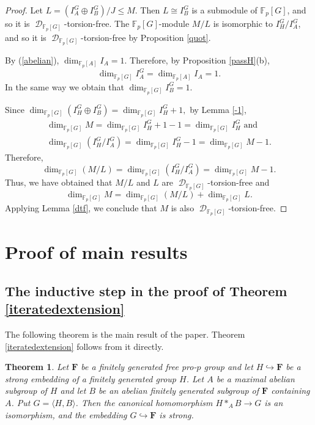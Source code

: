 \documentclass[11pt]{amsart}
\newtheorem{teo}[lem]{Theorem}
\numberwithin{claimcounter}{lem}
\DeclareMathOperator{\D}{\mathcal D}
\newcommand{\F}{\mathbb{F}}
\begin{document}
\begin{proof} Let $L=(I^G_A\oplus I^G_B)/J\le M$. Then $L\cong I^G_B $ is a submodule of $\F_p[G]$, and so it is $\D_{\F_p[G]}$-torsion-free. The $\F_p[G]$-module $M/L$ is isomorphic to $I_H^G/I^G_A$, and so it is $\D_{\F_p[G]}$-torsion-free by Proposition \ref{quot}.

By  (\ref{abelian}), $\dim_{\F_p[A]} I_A=1$. Therefore, by Proposition \ref{passH}(b), $$\dim_{\F_p[G]}I^G_A=\dim_{\F_p[A]} I_A=1.$$ 
In the same way we obtain that $\dim_{\F_p[G]}I^G_B=1$. 

Since $\dim_{\F_p[G]}(I^G_H\oplus I^G_B)=\dim_{\F_p[G]}I ^G_H +1,$ by Lemma \ref{-1},
  \begin{multline*}
  \dim_{\F_p[G]}M=\dim_{\F_p[G]}I ^G_H +1-1=\dim_{\F_p[G]}I^G_H \textrm{\ and}\\
     \dim_{\F_p[G]} (I_H^G/I^G_A)=\dim_{\F_p[G]}I ^G_H -1= \dim_{\F_p[G]} M-1.\end{multline*}
Therefore, 
$$\dim_{\F_p[G]} (M/L)=  \dim_{\F_p[G]} (I_H^G/I^G_A) = \dim_{\F_p[G]} M-1.$$
Thus, we have obtained that $M/L$ and $L$ are $\D_{\F_p[G]}$-torsion-free and  $$\dim_{\F_p[G]}M=\dim_{\F_p[G]} (M/L)+\dim_{\F_p[G]} L.$$
Applying  Lemma \ref{dtf}, we conclude that $M$ is also $\D_{\F_p[G]}$-torsion-free.
\end{proof}

\section{Proof of main results}\label{proofs}

\subsection{The inductive step in the proof of Theorem \ref{iteratedextension}}
The following theorem is the main result of the paper.  Theorem \ref{iteratedextension} follows  from it directly.
\begin{teo} \label{main} Let $\mathbf F$  be a finitely generated free pro-$p$ group and  let $H\hookrightarrow \mathbf F$ be  a strong embedding of  a finitely generated group  $H$.  Let   $A$ be a maximal abelian subgroup of $H$  and let $B$  be  an abelian finitely generated  subgroup of $\mathbf F$ containing $A$. Put $G=\langle H, B\rangle$. Then the canonical homomorphism   $ H*_AB \to G$ is an isomorphism, and the embedding $G \hookrightarrow \mathbf F$ is strong. %
\end{teo}
\end{document}

